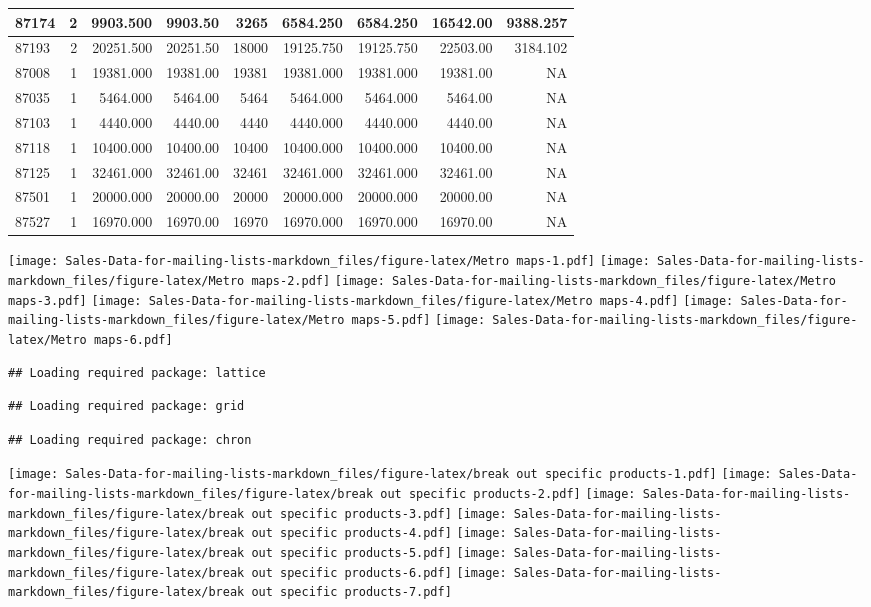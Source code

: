 \documentclass[
]{article}
\begin{document}
\begin{table}
\begin{tabular}[t]{l|r|r|r|r|r|r|r|r}
\hline
87174 & 2 & 9903.500 & 9903.50 & 3265 & 6584.250 & 6584.250 & 16542.00 & 9388.257\\
\hline
87193 & 2 & 20251.500 & 20251.50 & 18000 & 19125.750 & 19125.750 & 22503.00 & 3184.102\\
\hline
87008 & 1 & 19381.000 & 19381.00 & 19381 & 19381.000 & 19381.000 & 19381.00 & NA\\
\hline
87035 & 1 & 5464.000 & 5464.00 & 5464 & 5464.000 & 5464.000 & 5464.00 & NA\\
\hline
87103 & 1 & 4440.000 & 4440.00 & 4440 & 4440.000 & 4440.000 & 4440.00 & NA\\
\hline
87118 & 1 & 10400.000 & 10400.00 & 10400 & 10400.000 & 10400.000 & 10400.00 & NA\\
\hline
87125 & 1 & 32461.000 & 32461.00 & 32461 & 32461.000 & 32461.000 & 32461.00 & NA\\
\hline
87501 & 1 & 20000.000 & 20000.00 & 20000 & 20000.000 & 20000.000 & 20000.00 & NA\\
\hline
87527 & 1 & 16970.000 & 16970.00 & 16970 & 16970.000 & 16970.000 & 16970.00 & NA\\
\hline
\end{tabular}
\end{table}

\texttt{[image: Sales-Data-for-mailing-lists-markdown\_files/figure-latex/Metro maps-1.pdf]}
\texttt{[image: Sales-Data-for-mailing-lists-markdown\_files/figure-latex/Metro maps-2.pdf]}
\texttt{[image: Sales-Data-for-mailing-lists-markdown\_files/figure-latex/Metro maps-3.pdf]}
\texttt{[image: Sales-Data-for-mailing-lists-markdown\_files/figure-latex/Metro maps-4.pdf]}
\texttt{[image: Sales-Data-for-mailing-lists-markdown\_files/figure-latex/Metro maps-5.pdf]}
\texttt{[image: Sales-Data-for-mailing-lists-markdown\_files/figure-latex/Metro maps-6.pdf]}

\begin{verbatim}
## Loading required package: lattice
\end{verbatim}

\begin{verbatim}
## Loading required package: grid
\end{verbatim}

\begin{verbatim}
## Loading required package: chron
\end{verbatim}

\texttt{[image: Sales-Data-for-mailing-lists-markdown\_files/figure-latex/break out specific products-1.pdf]}
\texttt{[image: Sales-Data-for-mailing-lists-markdown\_files/figure-latex/break out specific products-2.pdf]}
\texttt{[image: Sales-Data-for-mailing-lists-markdown\_files/figure-latex/break out specific products-3.pdf]}
\texttt{[image: Sales-Data-for-mailing-lists-markdown\_files/figure-latex/break out specific products-4.pdf]}
\texttt{[image: Sales-Data-for-mailing-lists-markdown\_files/figure-latex/break out specific products-5.pdf]}
\texttt{[image: Sales-Data-for-mailing-lists-markdown\_files/figure-latex/break out specific products-6.pdf]}
\texttt{[image: Sales-Data-for-mailing-lists-markdown\_files/figure-latex/break out specific products-7.pdf]}
\end{document}
